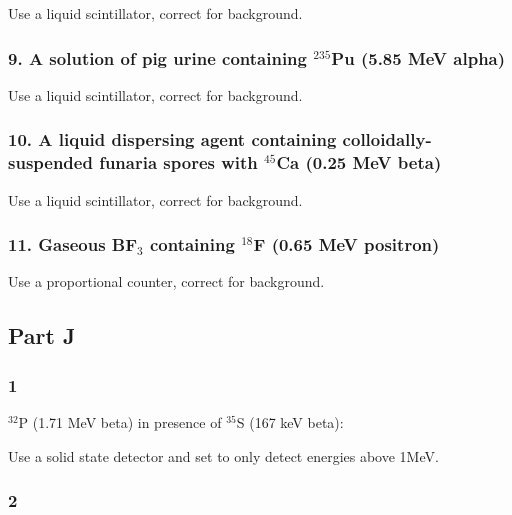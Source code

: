 \documentclass[11pt]{article}
\begin{document}
    Use a liquid scintillator, correct for background.

    \subsubsection{\texorpdfstring{9. A solution of pig urine containing
\(^{235}\)Pu (5.85 MeV
alpha)}{9. A solution of pig urine containing \^{}\{235\}Pu (5.85 MeV alpha)}}\label{a-solution-of-pig-urine-containing-235pu-5.85-mev-alpha}

    Use a liquid scintillator, correct for background.

    \subsubsection{\texorpdfstring{10. A liquid dispersing agent containing
colloidally-suspended funaria spores with \(^{45}\)Ca (0.25 MeV
beta)}{10. A liquid dispersing agent containing colloidally-suspended funaria spores with \^{}\{45\}Ca (0.25 MeV beta)}}\label{a-liquid-dispersing-agent-containing-colloidally-suspended-funaria-spores-with-45ca-0.25-mev-beta}

    Use a liquid scintillator, correct for background.

    \subsubsection{\texorpdfstring{11. Gaseous BF\(_3\) containing
\(^{18}\)F (0.65 MeV
positron)}{11. Gaseous BF\_3 containing \^{}\{18\}F (0.65 MeV positron)}}\label{gaseous-bf_3-containing-18f-0.65-mev-positron}

    Use a proportional counter, correct for background.

    \subsection{Part J}\label{part-j}

    \subsubsection{1}\label{section}

    \(^{32}\)P (1.71 MeV beta) in presence of \(^{35}\)S (167 keV beta):

Use a solid state detector and set to only detect energies above 1MeV.

    \subsubsection{2}\label{section}
\end{document}
